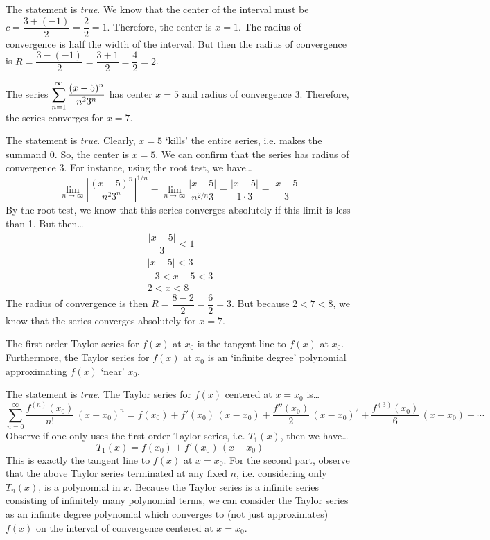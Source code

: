 \documentclass[11pt,letterpaper]{article}
\begin{document}
\sol The statement is \textit{true}. We know that the center of the interval must be $c= \dfrac{3 + (-1)}{2}= \dfrac{2}{2}= 1$. Therefore, the center is $x= 1$. The radius of convergence is half the width of the interval. But then the radius of convergence is $R= \dfrac{3 - (-1)}{2}= \dfrac{3 + 1}{2}= \dfrac{4}{2}= 2$. \pvspace{1.3cm}



\newpage



 The series $\displaystyle\sum_{n=1}^\infty \dfrac{(x - 5)^n}{n^2 3^n}$ has center $x= 5$ and radius of convergence 3. Therefore, the series converges for $x= 7$. \pspace

\sol The statement is \textit{true}. Clearly, $x= 5$ `kills' the entire series, i.e. makes the summand 0. So, the center is $x= 5$. We can confirm that the series has radius of convergence 3. For instance, using the root test, we have\dots
	\[
	\lim_{n \to \infty} \left| \dfrac{(x - 5)^n}{n^2 3^n} \right|^{1/n}= \lim_{n \to \infty} \dfrac{|x - 5|}{n^{2/n} 3}= \dfrac{|x - 5|}{1 \cdot 3}= \dfrac{|x - 5|}{3}
	\]
By the root test, we know that this series converges absolutely if this limit is less than 1. But then\dots
	\[
	\begin{gathered}
	\dfrac{|x - 5|}{3} < 1 \\
	|x - 5| < 3 \\
	-3 < x - 5 < 3 \\
	2 < x < 8
	\end{gathered}
	\]
The radius of convergence is then $R= \dfrac{8 - 2}{2}= \dfrac{6}{2}= 3$. But because $2 < 7 < 8$, we know that the series converges absolutely for $x= 7$. \pvspace{1.3cm}



 The first-order Taylor series for $f(x)$ at $x_0$ is the tangent line to $f(x)$ at $x_0$. Furthermore, the Taylor series for $f(x)$ at $x_0$ is an `infinite degree' polynomial approximating $f(x)$ `near' $x_0$. \pspace

\sol The statement is \textit{true}. The Taylor series for $f(x)$ centered at $x= x_0$ is\dots
	\[
	\sum_{n=0}^\infty \dfrac{f^{(n)}(x_0)}{n!} \, (x - x_0)^n= f(x_0) + f'(x_0) \,(x - x_0) + \dfrac{f''(x_0)}{2} \,(x - x_0)^2 + \dfrac{f^{(3)}(x_0)}{6} \,(x - x_0) + \cdots
	\]
Observe if one only uses the first-order Taylor series, i.e. $T_1(x)$, then we have\dots
	\[
	T_1(x)= f(x_0) + f'(x_0) \,(x - x_0)
	\]
This is exactly the tangent line to $f(x)$ at $x= x_0$. For the second part, observe that the above Taylor series terminated at any fixed $n$, i.e. considering only $T_n(x)$, is a polynomial in $x$. Because the Taylor series is a infinite series consisting of infinitely many polynomial terms, we can consider the Taylor series as an infinite degree polynomial which converges to (not just approximates) $f(x)$ on the interval of convergence centered at $x= x_0$. \pvspace{1.3cm}
\end{document}
